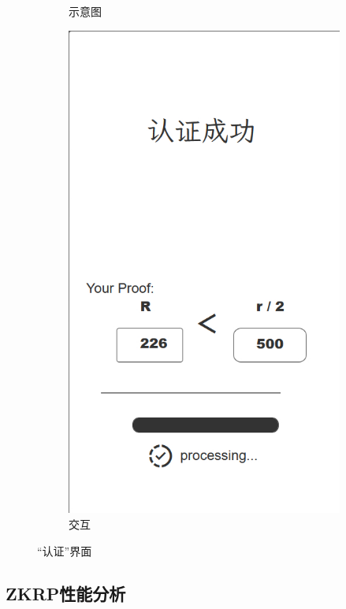 \documentclass[zihao=-4]{ctexart}
\begin{document}
\begin{figure}[htbp]
\begin{subfigure}{0.31\textwidth}
    \caption{示意图}
  \end{subfigure}%
  \hspace*{2cm}   %
  \begin{subfigure}{0.31\textwidth}
    \includegraphics[width=\linewidth]{前端-认证成功.jpg}
    \caption{交互} 
  \end{subfigure}
\caption{“认证”界面}
\label{verify}
\end{figure}
\subsection{ZKRP性能分析}
\end{document}
